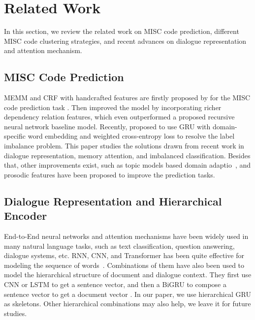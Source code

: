 \section{Related Work}
\label{sec:sentential:related}
In this section, we review the related work on MISC code prediction,
different MISC code clustering strategies, and recent advances on
dialogue representation and attention mechanism.

\subsection{MISC Code Prediction}
\label{ssec:sentential:misc-related}

MEMM and CRF with handcrafted features are firstly proposed by
\citet{can2012case, can2015dialog} for the MISC code prediction task
. Then \citet{tanana2015recursive} improved the model by incorporating
richer dependency relation features, which even outperformed a
proposed recursive neural network baseline model. Recently,
\cite{xiao2016behavioral} proposed to use GRU with domain-specific word
embedding and weighted cross-entropy loss to resolve the label
imbalance problem. This paper studies the solutions drawn from
recent work in dialogue representation, memory attention, and
imbalanced classification. Besides that, other improvements exist,
such as topic models based domain adaptio~\cite{atkins2014scaling,
  huang2018modeling}, and prosodic features \cite{weber2002using} have
been proposed to improve the prediction tasks.



\subsection{Dialogue Representation and Hierarchical Encoder }
\label{ssec:sentential:dialogue-encoder}

End-to-End neural networks and attention mechanisms have been widely
used in many natural language tasks, such as text classification,
question answering, dialogue systems, etc.  RNN, CNN, and
Transformer has been quite effective for modeling the sequence of
words~\cite{ kim14cnn,zhang2015character}. Combinations of them have
also been used to model the hierarchical structure of document and
dialogue context. They first use CNN or LSTM to get a sentence vector,
and then a BiGRU to compose a sentence vector to get a document
vector \citep{tang2015document, li2015hierarchical,
  yang2016hierarchical,sordoni2015hierarchical, serban2016building,
  serban2017multiresolution}. In our paper, we use hierarchical GRU as
skeletons. Other hierarchical combinations may also help, we leave it
for future studies.

